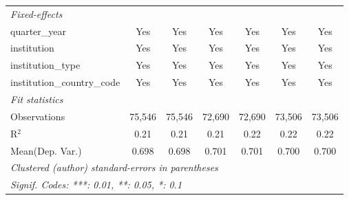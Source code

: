 \begin{tabular}{lcccccc}
   \midrule
   \emph{Fixed-effects}\\
   quarter\_year                      & Yes     & Yes         & Yes     & Yes      & Yes     & Yes\\  
   institution                        & Yes     & Yes         & Yes     & Yes      & Yes     & Yes\\  
   institution\_type                  & Yes     & Yes         & Yes     & Yes      & Yes     & Yes\\  
   institution\_country\_code         & Yes     & Yes         & Yes     & Yes      & Yes     & Yes\\  
   \midrule
   \emph{Fit statistics}\\
   Observations                       & 75,546  & 75,546      & 72,690  & 72,690   & 73,506  & 73,506\\  
   R$^2$                              & 0.21    & 0.21        & 0.21    & 0.22     & 0.22    & 0.22\\  
Mean(Dep. Var.) & 0.698 & 0.698 & 0.701 & 0.701 & 0.700 & 0.700 \\
   \midrule \midrule
   \multicolumn{7}{l}{\emph{Clustered (author) standard-errors in parentheses}}\\
   \multicolumn{7}{l}{\emph{Signif. Codes: ***: 0.01, **: 0.05, *: 0.1}}\\
\end{tabular}
\par\endgroup
